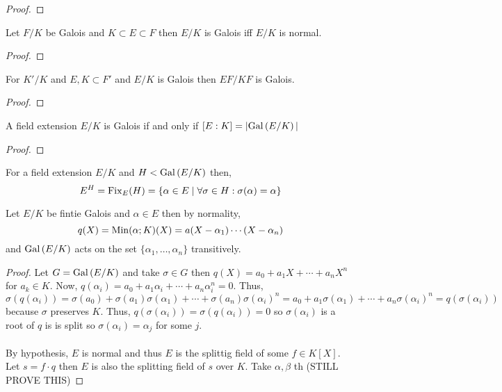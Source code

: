 \documentclass[12pt]{extarticle}
\begin{document}
\begin{proof}

\end{proof}

\begin{proposition}
Let $F/K$ be Galois and $K \subset E \subset F$ then $E/K$ is Galois iff $E/K$ is normal.
\end{proposition}

\begin{proof}

\end{proof}

\begin{proposition}
For $K'/K$ and $E, K \subset F'$ and $E/K$ is Galois then $EF/KF$ is Galois. 
\end{proposition}

\begin{proof}

\end{proof}

\begin{theorem}
A field extension $E/K$ is Galois if and only if $[E : K] = |\mathrm{Gal}\left( E/K \right)|$  
\end{theorem}

\begin{proof}

\end{proof}

\begin{definition}
For a field extension $E/K$ and $H < \mathrm{Gal}\left( E/K \right)$ then, \[E^H = \mathrm{Fix}_{E} (H) = \{\alpha \in E \mid \forall \sigma \in H : \sigma(\alpha) = \alpha\}\]
\end{definition}

\begin{proposition}
Let $E/K$ be fintie Galois and $\alpha \in E$ then by normality, \[q(X) = \mathrm{Min}(\alpha;K)(X) = a (X - \alpha_1) \cdots (X - \alpha_n)\] and $\mathrm{Gal}\left( E/K \right)$ acts on the set $\{\alpha_1, \dots, \alpha_n\}$ transitively. 
\end{proposition}

\begin{proof}
Let $G = \mathrm{Gal}\left( E/K \right)$ and take $\sigma \in G$ then $q(X) = a_0 + a_1 X + \cdots + a_n X^n$ for $a_k \in K$. Now, $q(\alpha_i) = a_0 + a_1 \alpha_i + \cdots + a_n \alpha_i^n = 0$. Thus,
\[\sigma(q(\alpha_i)) = \sigma(a_0) + \sigma(a_1) \sigma(\alpha_1) + \cdots + \sigma(a_n) \sigma(\alpha_i)^n = a_0 + a_1 \sigma(\alpha_1) + \cdots + a_n \sigma(\alpha_i)^n = q(\sigma(\alpha_i))\]
because $\sigma$ preserves $K$. Thus, $q(\sigma(\alpha_i)) = \sigma(q(\alpha_i)) = 0$ so $\sigma(\alpha_i)$ is a root of $q$ is is split so $\sigma(\alpha_i) = \alpha_j$ for some $j$. \\\\
By hypothesis, $E$ is normal and thus $E$ is the splittig field of some $f \in K[X]$. Let $s = f \cdot q$ then $E$ is also the splitting field of $s$ over $K$. Take $\alpha, \beta$ th (STILL PROVE THIS)
\end{proof}
\end{document}
